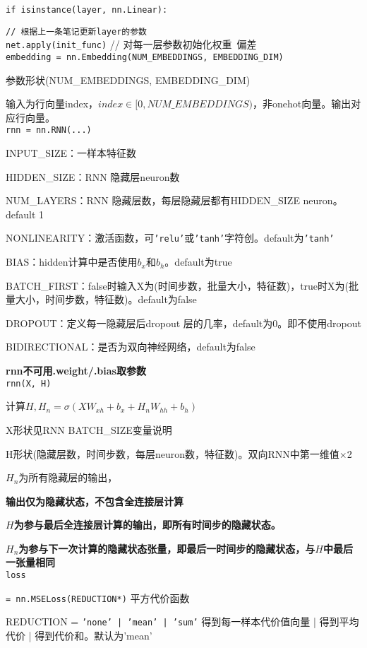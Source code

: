 \documentclass[UTF8]{ctexart}
\begin{document}
  \texttt{if isinstance(layer, nn.Linear):}

  \quad \texttt{// 根据上一条笔记更新layer的参数}\\
\texttt{net.apply(init\_func)} // 对每一层参数初始化权重\ 偏差\\
\texttt{embedding = nn.Embedding(NUM\_EMBEDDINGS, EMBEDDING\_DIM)}

  参数形状(NUM\_EMBEDDINGS, EMBEDDING\_DIM)
  
  输入为行向量index，$index \in [0, NUM\_EMBEDDINGS)$，非onehot向量。输出对应行向量。\\
\texttt{rnn = nn.RNN(...)}
  
  INPUT\_SIZE：一样本特征数
  
  HIDDEN\_SIZE：RNN 隐藏层neuron数
  
  NUM\_LAYERS：RNN 隐藏层数，每层隐藏层都有HIDDEN\_SIZE neuron。default 1
  
  NONLINEARITY：激活函数，可\texttt{'relu'}或\texttt{'tanh'}字符创。default为\texttt{'tanh'}

  BIAS：hidden计算中是否使用$b_x$和$b_h$。default为true

  BATCH\_FIRST：false时输入X为(时间步数，批量大小，特征数)，true时X为(批量大小，时间步数，特征数)。default为false

  DROPOUT：定义每一隐藏层后dropout 层的几率，default为0。即不使用dropout

  BIDIRECTIONAL：是否为双向神经网络，default为false
  
  \textbf{rnn不可用.weight/.bias取参数}\\
\texttt{rnn(X, H)}

  计算$H, H_n = \sigma(XW_{xh} + b_x + H_nW_{hh} + b_h)$

  \quad X形状见RNN BATCH\_SIZE变量说明

  \quad H形状(隐藏层数，时间步数，每层neuron数，特征数)。双向RNN中第一维值$\times$2

  \quad $H_n$为所有隐藏层的输出，
  
  \textbf{输出仅为隐藏状态，不包含全连接层计算}

  \textbf{$H$为参与最后全连接层计算的输出，即所有时间步的隐藏状态。}
  
  \textbf{$H_n$为参与下一次计算的隐藏状态张量，即最后一时间步的隐藏状态，与$H$中最后一张量相同}\\
\texttt{loss}

  \texttt{= nn.MSELoss(REDUCTION*)} 平方代价函数

  \quad REDUCTION = \texttt{'none' | 'mean' | 'sum'} 得到每一样本代价值向量 | 得到平均代价 | 得到代价和。默认为'mean'
\end{document}
